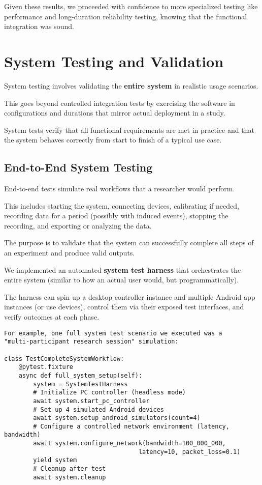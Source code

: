{{Given these results, we proceeded with confidence to more specialized testing
like performance and long-duration reliability testing, knowing that the
functional integration was sound.

\section{System Testing and Validation}

System testing involves validating the \textbf{entire system}
 in realistic usage scenarios.

This goes beyond controlled integration tests by exercising the software in
configurations and durations that mirror actual deployment in a study.

System tests verify that all functional requirements are met in practice and
that the system behaves correctly from start to finish of a typical use case.

\subsection{End-to-End System Testing}

End-to-end tests simulate real workflows that a researcher would perform.

This includes starting the system, connecting devices, calibrating if needed,
recording data for a period (possibly with induced events), stopping the
recording, and exporting or analyzing the data.

The purpose is to validate that the system can successfully complete all steps
of an experiment and produce valid outputs.

We implemented an automated \textbf{system test harness}
that orchestrates the entire system (similar to how an actual user would, but
programmatically).

The harness can spin up a desktop controller instance and multiple Android app
instances (or use devices), control them via their exposed test interfaces, and
verify outcomes at each phase.

\begin{verbatim}
For example, one full system test scenario we executed was a 
"multi-participant research session" simulation:

class TestCompleteSystemWorkflow:
    @pytest.fixture
    async def full_system_setup(self):
        system = SystemTestHarness
        # Initialize PC controller (headless mode)
        await system.start_pc_controller
        # Set up 4 simulated Android devices
        await system.setup_android_simulators(count=4)
        # Configure a controlled network environment (latency, bandwidth)
        await system.configure_network(bandwidth=100_000_000, 
                                     latency=10, packet_loss=0.1)
        yield system
        # Cleanup after test
        await system.cleanup


\end{verbatim}}}
